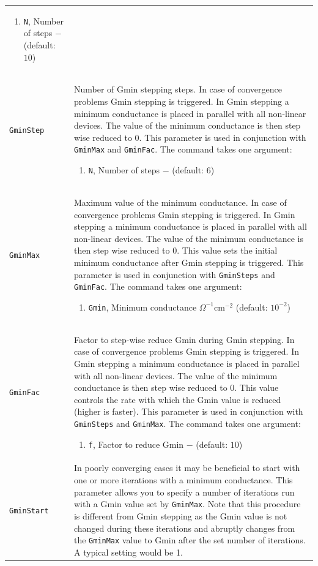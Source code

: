 \documentclass[noshowpacs,preprintnumbers,amsmath,amssymb, letter]{revtex4}
\begin{document}
\begin{longtable}{p{}p{}}
\begin{enumerate}
\item \texttt{N}, Number of steps $-$ (default: $10$)
\end{enumerate}\\
\texttt{GminStep} &  Number of Gmin stepping steps. In case of convergence problems Gmin stepping is triggered. In Gmin stepping a minimum conductance is placed in parallel with all non-linear devices. The value of the minimum conductance is then step wise reduced to 0. This parameter is used in conjunction with \texttt{GminMax} and \texttt{GminFac}. The command takes one argument:
\begin{enumerate}
\item \texttt{N}, Number of steps $-$ (default: $6$)
\end{enumerate}\\	
\texttt{GminMax} &  Maximum value of the minimum conductance. In case of convergence problems Gmin stepping is triggered. In Gmin stepping a minimum conductance is placed in parallel with all non-linear devices. The value of the minimum conductance is then step wise reduced to 0. This value sets the initial minimum conductance after Gmin stepping is triggered. This parameter is used in conjunction with \texttt{GminSteps} and \texttt{GminFac}. The command takes one argument:
\begin{enumerate}
\item \texttt{Gmin}, Minimum conductance $\Omega^{-1}\text{cm}^{-2}$ (default: $10^{-2}$)
\end{enumerate}\\
\texttt{GminFac} &  Factor to step-wise reduce Gmin during Gmin stepping. In case of convergence problems Gmin stepping is triggered. In Gmin stepping a minimum conductance is placed in parallel with all non-linear devices. The value of the minimum conductance is then step wise reduced to 0. This value controls the rate with which the Gmin value is reduced (higher is faster). This parameter is used in conjunction with \texttt{GminSteps} and \texttt{GminMax}. The command takes one argument:
\begin{enumerate}
\item \texttt{f}, Factor to reduce Gmin $-$ (default: $10$)
\end{enumerate}\\		
\texttt{GminStart} &  In poorly converging cases it may be beneficial to start with one or more iterations with a minimum conductance. This parameter allows you to specify a number of iterations run with a Gmin value set by \texttt{GminMax}. Note that this procedure is different from Gmin stepping as the Gmin value is not changed during these iterations and abruptly changes from the \texttt{GminMax} value to Gmin after the set number of iterations. A typical setting would be 1. 

\end{longtable}
\end{document}
